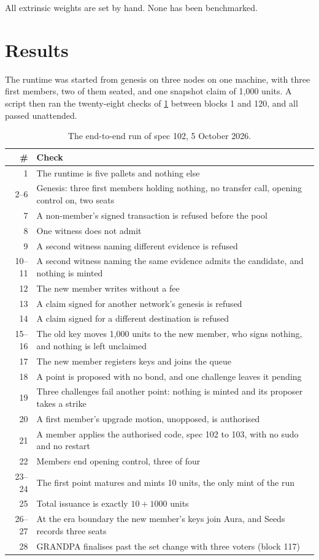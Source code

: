 \documentclass[11pt,a4paper]{article}
\theoremstyle{definition}
\theoremstyle{plain}
\theoremstyle{remark}
\begin{document}
All extrinsic weights are set by hand. None has been benchmarked.

\section{Results}
\label{sec:results}

The runtime was started from genesis on three nodes on one machine, with three first members, two of them seated, and one snapshot claim of 1,000 units. A script then ran the twenty-eight checks of \cref{tab:checks} between blocks 1 and 120, and all passed unattended.

\begin{table}[h]
\centering
\small
\caption{The end-to-end run of spec 102, 5 October 2026.}
\label{tab:checks}
\begin{tabularx}{\textwidth}{@{}rX@{}}
\toprule
\# & Check \\
\midrule
1 & The runtime is five pallets and nothing else \\
2--6 & Genesis: three first members holding nothing, no transfer call, opening control on, two seats \\
7 & A non-member's signed transaction is refused before the pool \\
8 & One witness does not admit \\
9 & A second witness naming different evidence is refused \\
10--11 & A second witness naming the same evidence admits the candidate, and nothing is minted \\
12 & The new member writes without a fee \\
13 & A claim signed for another network's genesis is refused \\
14 & A claim signed for a different destination is refused \\
15--16 & The old key moves 1,000 units to the new member, who signs nothing, and nothing is left unclaimed \\
17 & The new member registers keys and joins the queue \\
18 & A point is proposed with no bond, and one challenge leaves it pending \\
19 & Three challenges fail another point: nothing is minted and its proposer takes a strike \\
20 & A first member's upgrade motion, unopposed, is authorised \\
21 & A member applies the authorised code, spec 102 to 103, with no sudo and no restart \\
22 & Members end opening control, three of four \\
23--24 & The first point matures and mints 10 units, the only mint of the run \\
25 & Total issuance is exactly $10 + 1000$ units \\
26--27 & At the era boundary the new member's keys join Aura, and Seeds records three seats \\
28 & GRANDPA finalises past the set change with three voters (block 117) \\
\bottomrule
\end{tabularx}
\end{table}
\end{document}
